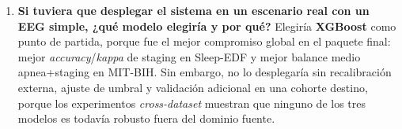 \begin{enumerate}[leftmargin=*]
\item \textbf{Si tuviera que desplegar el sistema en un escenario real con un EEG simple, ¿qu\'e modelo elegir\'ia y por qu\'e?} Elegir\'ia \textbf{XGBoost} como punto de partida, porque fue el mejor compromiso global en el paquete final: mejor \emph{accuracy}/\emph{kappa} de staging en Sleep-EDF y mejor balance medio apnea+staging en MIT-BIH. Sin embargo, no lo desplegar\'ia sin recalibraci\'on externa, ajuste de umbral y validaci\'on adicional en una cohorte destino, porque los experimentos \emph{cross-dataset} muestran que ninguno de los tres modelos es todav\'ia robusto fuera del dominio fuente.
\end{enumerate}
